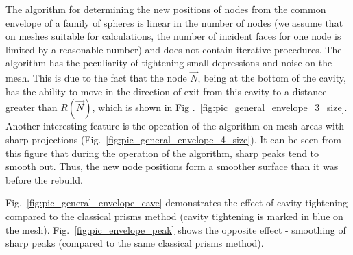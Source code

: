 \documentclass[
11pt,%
tightenlines,%
twoside,%
onecolumn,%
nofloats,%
nobibnotes,%
nofootinbib,%
superscriptaddress,%
noshowpacs,%
centertags]%
{revtex4-2}
\begin{document}
The algorithm for determining the new positions of nodes from the common envelope of a family of spheres is linear in the number of nodes (we assume that on meshes suitable for calculations, the number of incident faces for one node is limited by a reasonable number) and does not contain iterative procedures.
The algorithm has the peculiarity of tightening small depressions and noise on the mesh.
This is due to the fact that the node $\vec{N}$, being at the bottom of the cavity, has the ability to move in the direction of exit from this cavity to a distance greater than $R(\vec{N})$, which is shown in Fig .~\ref{fig:pic_general_envelope_3_size}.
Another interesting feature is the operation of the algorithm on mesh areas with sharp projections (Fig.~\ref{fig:pic_general_envelope_4_size}).
It can be seen from this figure that during the operation of the algorithm, sharp peaks tend to smooth out.
Thus, the new node positions form a smoother surface than it was before the rebuild.

Fig.~\ref{fig:pic_general_envelope_cave} demonstrates the effect of cavity tightening compared to the classical prisms method (cavity tightening is marked in blue on the mesh).
Fig.~\ref{fig:pic_envelope_peak} shows the opposite effect - smoothing of sharp peaks (compared to the same classical prisms method).
\end{document}
